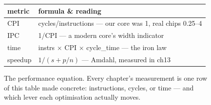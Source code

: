 \begin{figure}[htbp]
\centering
\begin{tabular}{ll}
\toprule
metric & formula \& reading \\
\midrule
CPI & cycles/instructions --- our core was 1, real chips 0.25--4 \\
IPC & 1/CPI --- a modern core's width indicator \\
time & instrs $\times$ CPI $\times$ cycle\_time --- the iron law \\
speedup & $1/(s{+}p/n)$ --- Amdahl, measured in ch13 \\
\bottomrule
\end{tabular}
\caption{The performance equation. Every chapter's measurement is
one row of this table made concrete: instructions, cycles, or
time --- and which lever each optimisation actually moves.}
\label{fig:cpi15}
\end{figure}
